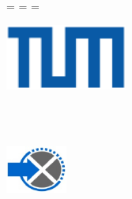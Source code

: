 \begin{titlepage}
  \oddsidemargin=\evensidemargin\relax
  \textwidth=\dimexpr{}\evensidemargin-2in\relax
  \hsize=\textwidth\relax

  \centering

  \includegraphics[width=40mm]{logos/tum}


  \vspace{5mm}
  {\huge\MakeUppercase{\getUniversity{}}}\\
  
  \vspace{10mm}
  {\large\MakeUppercase{\getGroup{}}}\\

  \vspace{15mm}
  {\Large \getDoctype{}}

  \vspace{15mm}
  {\huge\bfseries \getTitleGer{}}

  \vspace{15mm}
  {\LARGE \getAuthor{}}

  \vspace{20mm}
  \includegraphics[width=20mm]{logos/fachgebiet} 
  
\end{titlepage}
